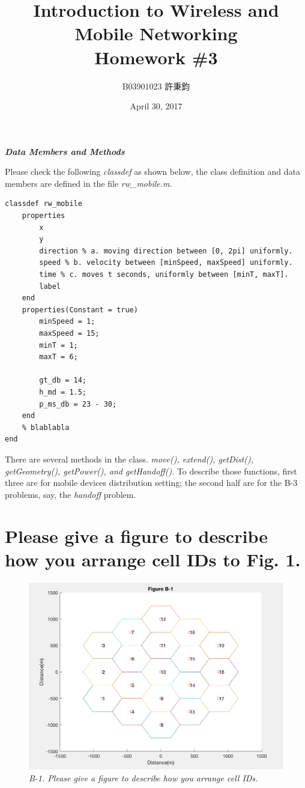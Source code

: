 \documentclass{article}
\title{Introduction to Wireless and Mobile Networking\\ Homework \#3}
\author{B03901023 許秉鈞}
\date{April 30, 2017} %
\begin{document}
\maketitle
\textbf{\textit{Data Members and Methods}}

Please check the following \emph{classdef} as shown below, the class definition and data members are defined in the file \emph{rw\_mobile.m}.
\begin{lstlisting}[caption = {rw\_mobile.m}]
classdef rw_mobile
    properties
        x
        y
        direction % a. moving direction between [0, 2pi] uniformly.
        speed % b. velocity between [minSpeed, maxSpeed] uniformly.
        time % c. moves t seconds, uniformly between [minT, maxT].
        label
    end
    properties(Constant = true)
        minSpeed = 1;
        maxSpeed = 15;
        minT = 1;
        maxT = 6;

        gt_db = 14;
        h_md = 1.5;
        p_ms_db = 23 - 30;
    end
    % blablabla
end
\end{lstlisting}
There are several methods in the class. \emph{move(), extend(), getDist(), getGeometry(), getPower(), and getHandoff()}. To describe those functions, first three are for mobile devices distribution setting; the second half are for the B-3 problems, say, the \emph{handoff} problem.

\section{Please give a figure to describe how you arrange cell IDs to Fig. 1.}
\begin{figure}[h]
    \centering
    \includegraphics[width=1\textwidth]{fig1}
    \caption{\emph{B-1. Please give a figure to describe how you arrange cell IDs.}}
    \label{fig:mesh1}
\end{figure}
\end{document}
